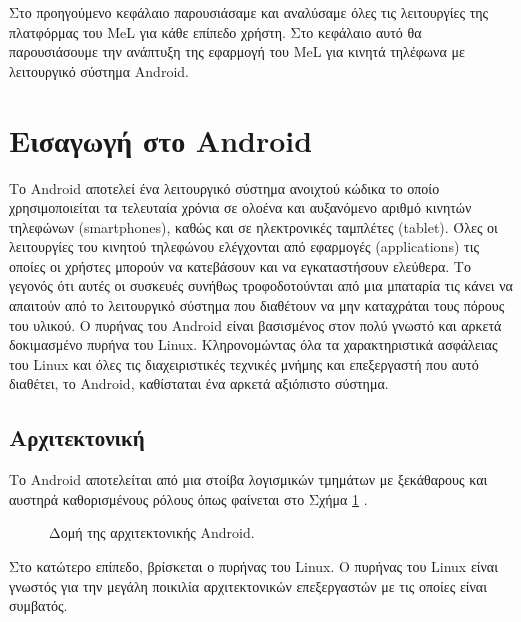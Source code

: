 

Στο προηγούμενο κεφάλαιο παρουσιάσαμε και αναλύσαμε όλες τις λειτουργίες της πλατφόρμας του \textlatin{MeL} για κάθε επίπεδο χρήστη. Στο κεφάλαιο αυτό θα παρουσιάσουμε την ανάπτυξη της εφαρμογή του \textlatin{MeL} για κινητά τηλέφωνα με λειτουργικό σύστημα \textlatin{Android}. 


\section{Εισαγωγή στο \textlatin{Android}}

Το \textlatin{Android} αποτελεί ένα λειτουργικό σύστημα ανοιχτού κώδικα το οποίο χρησιμοποιείται τα τελευταία χρόνια σε ολοένα και αυξανόμενο αριθμό κινητών τηλεφώνων (\textlatin{smartphones}), καθώς και σε ηλεκτρονικές ταμπλέτες (\textlatin{tablet}). Όλες οι λειτουργίες του κινητού τηλεφώνου ελέγχονται από εφαρμογές (\textlatin{applications}) τις οποίες οι χρήστες μπορούν να κατεβάσουν και να εγκαταστήσουν ελεύθερα. Το γεγονός ότι αυτές οι συσκευές συνήθως τροφοδοτούνται από μια μπαταρία τις κάνει να απαιτούν από το λειτουργικό σύστημα που διαθέτουν να μην καταχράται τους πόρους του υλικού. Ο πυρήνας του \textlatin{Android} είναι βασισμένος στον πολύ γνωστό και αρκετά δοκιμασμένο πυρήνα του \textlatin{Linux}. Κληρονομώντας όλα τα χαρακτηριστικά ασφάλειας του \textlatin{Linux} και όλες τις διαχειριστικές τεχνικές μνήμης και επεξεργαστή που αυτό διαθέτει, το \textlatin{Android}, καθίσταται ένα αρκετά αξιόπιστο σύστημα.

\subsection{Αρχιτεκτονική}

Το \textlatin{Android} αποτελείται από μια στοίβα λογισμικών τμημάτων με ξεκάθαρους και αυστηρά καθορισμένους ρόλους όπως φαίνεται στο Σχήμα \ref{fig:android_archit} \cite{android}.

\begin{figure}[tbh]
	\caption{Δομή της αρχιτεκτονικής \textlatin{Android}.}
	\label{fig:android_archit}
\end{figure}

Στο κατώτερο επίπεδο, βρίσκεται ο πυρήνας του \textlatin{Linux}. Ο πυρήνας του \textlatin{Linux} είναι γνωστός για την μεγάλη ποικιλία αρχιτεκτονικών επεξεργαστών με τις οποίες είναι συμβατός.

